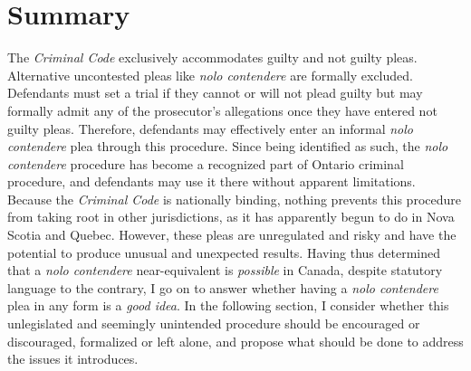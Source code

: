 \section{Summary}

The \textit{Criminal Code} exclusively accommodates guilty and not guilty pleas. Alternative uncontested pleas like \textit{nolo contendere} are formally excluded. Defendants must set a trial if they cannot or will not plead guilty but may formally admit any of the prosecutor's allegations once they have entered not guilty pleas. Therefore, defendants may effectively enter an informal \textit{nolo contendere} plea through this procedure. Since being identified as such, the \textit{nolo contendere} procedure has become a recognized part of Ontario criminal procedure, and defendants may use it there without apparent limitations. Because the \textit{Criminal Code} is nationally binding, nothing prevents this procedure from taking root in other jurisdictions, as it has apparently begun to do in Nova Scotia and Quebec. However, these pleas are unregulated and risky and have the potential to produce unusual and unexpected results. Having thus determined that a \textit{nolo contendere} near-equivalent is \textit{possible} in Canada, despite statutory language to the contrary, I go on to answer whether having a \textit{nolo contendere} plea in any form is a \textit{good idea}. In the following section, I consider whether this unlegislated and seemingly unintended procedure should be encouraged or discouraged, formalized or left alone, and propose what should be done to address the issues it introduces.